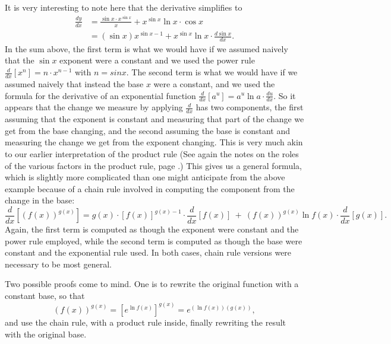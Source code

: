 \eex
It is very interesting to note here that the derivative simplifies
to
\begin{align*}
\frac{dy}{dx}&=\frac{\sin x\cdot x^{\sin x}}{x}+x^{\sin x}\ln x\cdot\cos x\\
             &=(\sin x)x^{\sin x-1}+x^{\sin x}\ln x\cdot\frac{d\sin x}{dx}.
\end{align*}
In the sum above, the first term is what we would have if we
assumed naively that the $\sin x$ exponent were a constant and
we used the power rule $\frac{d}{dx}\left[x^n\right]=n\cdot x^{n-1}$
with $n=sin x$.  The second term is what we would have if
we assumed naively that instead the base $x$ were a constant,
and we used the formula for the derivative of an exponential
function $\frac{d}{dx}\left[a^u\right]=a^u\ln a\cdot\frac{du}{dx}$.
So it appears that the change we measure by applying $\frac{d}{dx}$
has two components, the first assuming that the exponent is constant
and measuring that part of the change we get from the base changing,
and the second assuming the base is constant and measuring the change
we get from the exponent changing.  This is very much akin
to our earlier interpretation of the product rule
(See again the notes on the roles of the various factors in the 
product rule, page \pageref{NotesOnProductRule}.)  This gives us
a general formula, which is slightly more complicated than one might
anticipate from the above example because of a chain rule involved
in computing the component from the change in the base:
\begin{equation}
\frac{d}{dx}\left[(f(x))^{g(x)}\right]
   =g(x)\cdot[f(x)]^{g(x)-1}\cdot\frac{d}{dx}[f(x)]
    \ +\ (f(x))^{g(x)}\ln f(x)\cdot\frac{d}{dx}[g(x)].
\label{FuctionRaisedToAFunction}\end{equation}
Again, the first term is computed as though the exponent were
constant and the power rule employed, while the second term 
is computed as though the base were constant and the exponential
rule used.  In both cases, chain rule versions were necessary
to be most general.

Two possible proofs come to mind.  One is to rewrite the original
function with a constant base, so that
$$(f(x))^{g(x)}=\left[e^{\ln f(x)}\right]^{g(x)}
   =e^{(\ln f(x))(g(x))},$$
and use the chain rule, with a product rule inside, finally rewriting
the result with the original base.

